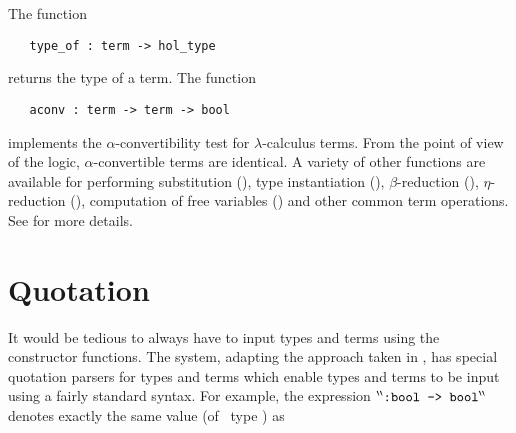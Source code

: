 The function

\begin{boxed}
\begin{verbatim}
   type_of : term -> hol_type
\end{verbatim}
\end{boxed}

\noindent returns the type
of a term. The function

\begin{boxed}
\begin{verbatim}
   aconv : term -> term -> bool
\end{verbatim}
\end{boxed}

\noindent implements the $\alpha$-convertibility test for
$\lambda$-calculus terms.
%
%
From the point of view of the \HOL{} logic, $\alpha$-convertible terms
are identical. A variety of other functions are available for
performing substitution (), type instantiation (),
$\beta$-reduction (), $\eta$-reduction
(), computation of free variables () and
other common term operations.  See \REFERENCE{} for more details.


\section{Quotation}
\label{quotation}\label{gen-abs}\label{let}

It would be tedious to always have to input types and terms
using the constructor functions. The \HOL{} system, adapting the
approach taken in \LCF{}, has special
quotation
parsers for \HOL{} types and terms which enable types and terms
to be input using a fairly standard syntax. For example, the \ML{}
expression $\holquote{\ml{:bool -> bool}}$ denotes exactly the same
value (of \ML\ type ) as

